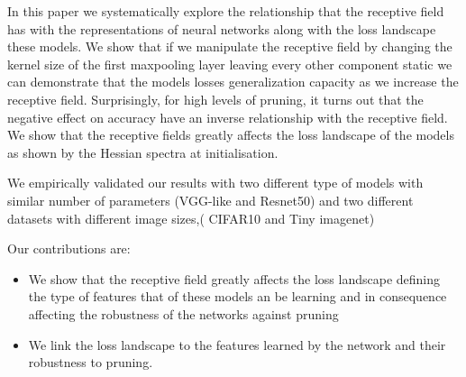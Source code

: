 In this paper we systematically explore the relationship that the receptive field has with the representations of neural networks
along with the loss landscape these models. We show that if we manipulate the receptive field by changing the kernel
size of the first maxpooling layer leaving every other component static we can demonstrate that the models losses
generalization capacity as we increase the receptive field. Surprisingly, for high levels of pruning, it turns out
that the negative effect on accuracy have an inverse relationship with the receptive field. We show that the
receptive fields greatly affects the loss landscape of the models as shown by the Hessian spectra at initialisation.

We empirically validated our results with two different type of models  with similar number of parameters (VGG-like and
Resnet50) and two different datasets with different image sizes,( CIFAR10 and Tiny imagenet)

Our contributions are:
\begin{itemize}
  \item We show that the receptive field greatly affects the loss landscape defining the type of features that of these models an be
    learning and in consequence affecting the robustness of the networks against pruning
  \item We link the loss landscape to the features learned by the network and their robustness to pruning.
\end{itemize}


